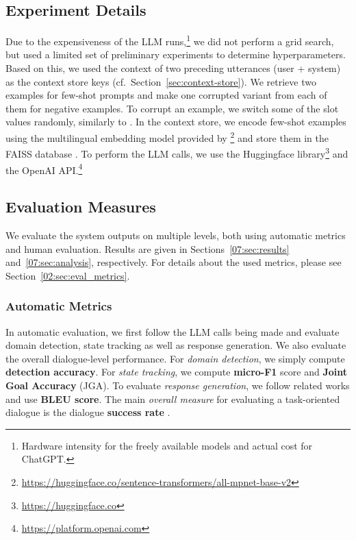 \subsection{Experiment Details}
\label{subsec:exp-details}
Due to the expensiveness of the LLM runs,\footnote{Hardware intensity for the freely available models and actual cost for ChatGPT.} we did not perform a grid search, but used a limited set of preliminary experiments to determine hyperparameters.
Based on this, we used the context of two preceding  utterances (user + system) as the context store keys (cf.~Section~\ref{sec:context-store}).
We retrieve two examples for few-shot prompts and make one corrupted variant from each of them for negative examples.
To corrupt an example, we switch some of the slot values randomly, similarly to \citet{kulhanek-etal-2021-augpt}.
In the context store, we encode few-shot examples using the multilingual embedding model provided by \citet{reimers-2020-multilingual-sentence-bert}\footnote{\url{https://huggingface.co/sentence-transformers/all-mpnet-base-v2}} and store them in the FAISS database \cite{johnson2019billion}.
To perform the LLM calls, we use the Huggingface library\footnote{\url{https://huggingface.co}} and the OpenAI API.\footnote{\url{https://platform.openai.com}}

\subsection{Evaluation Measures}

We evaluate the system outputs on multiple levels, both using automatic metrics and human evaluation. Results are given in Sections~\ref{07:sec:results} and~\ref{07:sec:analysis}, respectively.
For details about the used metrics, please see Section~\ref{02:sec:eval_metrics}.
\subsubsection*{Automatic Metrics}
In automatic evaluation, we first follow the LLM calls being made and evaluate domain detection, state tracking as well as response generation. We also evaluate the overall dialogue-level performance.
For \emph{domain detection}, we simply compute \textbf{detection accuracy}.
For \emph{state tracking}, we compute \textbf{micro-F1} score and \textbf{Joint Goal Accuracy} (JGA).
To evaluate \emph{response generation}, we follow related works and use \textbf{BLEU score}.
The main \emph{overall measure} for evaluating a task-oriented dialogue is the dialogue \textbf{success rate} \cite{deriu_survey_2021}.

